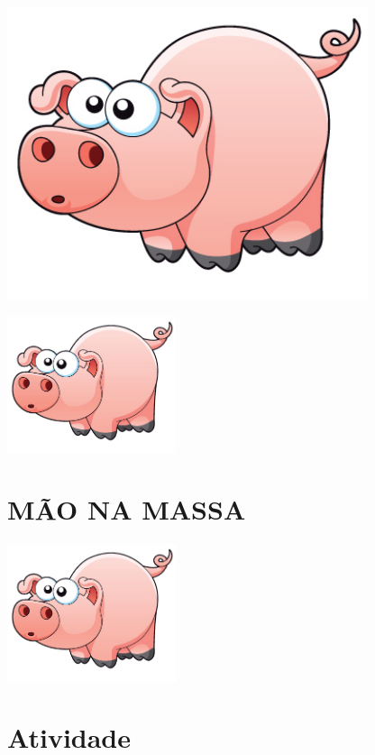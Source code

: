 \documentclass[a4,12pt]{book}
\begin{document}
\begin{imagem*}[breakable]{}{}       \includegraphics[width=300pt, keepaspectratio]{pig}   \end{imagem*}



\includegraphics[width=\textwidth,height=4cm, keepaspectratio]{pig}
\section*{ MÃO NA MASSA }





\includegraphics[width=\textwidth,height=4cm, keepaspectratio]{pig}
\section{Atividade}
\end{document}
